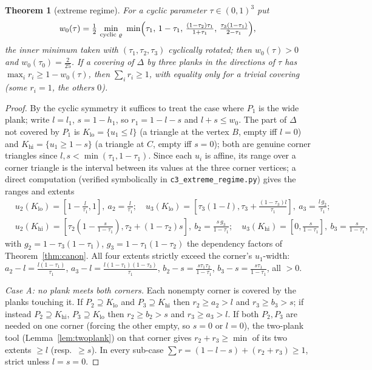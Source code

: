 \documentclass[11pt,reqno]{amsart}
\theoremstyle{plain}
\newtheorem{theorem}{Theorem}[section]
\theoremstyle{definition}
\theoremstyle{remark}
\begin{document}
\begin{theorem}[extreme regime]\label{thm:extreme}
For a cyclic parameter $\tau\in(0,1)^3$ put
\[
w_0(\tau)=\tfrac12\,\min_{\text{cyclic }\varrho}\ \min\Bigl(\tau_1,\,1-\tau_1,\,
\tfrac{(1-\tau_2)\tau_1}{1+\tau_1},\,\tfrac{\tau_3(1-\tau_1)}{2-\tau_1}\Bigr),
\]
the inner minimum taken with $(\tau_1,\tau_2,\tau_3)$ cyclically rotated; then
$w_0(\tau)>0$ and $w_0(\tau_0)=\tfrac2{25}$. If a covering of $\Delta$ by three
planks in the directions of $\tau$ has $\max_i r_i\ge1-w_0(\tau)$, then
$\sum_i r_i\ge1$, with equality only for a trivial covering (some $r_i=1$, the
others $0$).
\end{theorem}
\begin{proof}
By the cyclic symmetry it suffices to treat the case where $P_1$ is the wide
plank; write $l=l_1$, $s=1-h_1$, so $r_1=1-l-s$ and $l+s\le w_0$. The part of
$\Delta$ not covered by $P_1$ is $K_{\mathrm{lo}}=\{u_1\le l\}$ (a triangle at
the vertex $B$, empty iff $l=0$) and $K_{\mathrm{hi}}=\{u_1\ge1-s\}$ (a
triangle at $C$, empty iff $s=0$); both are genuine corner triangles since
$l,s<\min(\tau_1,1-\tau_1)$. Since each $u_i$ is affine, its range over a
corner triangle is the interval between its values at the three corner
vertices; a direct computation (verified symbolically in
\texttt{c3\_extreme\_regime.py}) gives the ranges and extents
\[
\begin{aligned}
&u_2(K_{\mathrm{lo}})=[1-\tfrac l{\tau_1},1],\ a_2=\tfrac l{\tau_1};\quad
u_3(K_{\mathrm{lo}})=[\tau_3(1-l),\tau_3+\tfrac{(1-\tau_3)l}{\tau_1}],\
a_3=\tfrac{l\,g_2}{\tau_1};\\
&u_2(K_{\mathrm{hi}})=[\tau_2(1-\tfrac s{1-\tau_1}),\tau_2+(1-\tau_2)s],\
b_2=\tfrac{s\,g_3}{1-\tau_1};\quad
u_3(K_{\mathrm{hi}})=[0,\tfrac s{1-\tau_1}],\ b_3=\tfrac s{1-\tau_1},
\end{aligned}
\]
with $g_2=1-\tau_3(1-\tau_1)$, $g_3=1-\tau_1(1-\tau_2)$ the dependency factors
of Theorem~\ref{thm:canon}. All four extents strictly exceed the corner's
$u_1$-width: $a_2-l=\tfrac{l(1-\tau_1)}{\tau_1}$, $a_3-l=\tfrac{l(1-\tau_1)
(1-\tau_3)}{\tau_1}$, $b_2-s=\tfrac{s\tau_1\tau_2}{1-\tau_1}$,
$b_3-s=\tfrac{s\tau_1}{1-\tau_1}$, all $>0$.

\emph{Case A: no plank meets both corners.} Each nonempty corner is covered by
the planks touching it. If $P_2\supseteq K_{\mathrm{lo}}$ and
$P_3\supseteq K_{\mathrm{hi}}$ then $r_2\ge a_2>l$ and $r_3\ge b_3>s$; if
instead $P_2\supseteq K_{\mathrm{hi}}$, $P_3\supseteq K_{\mathrm{lo}}$ then
$r_2\ge b_2>s$ and $r_3\ge a_3>l$. If both $P_2,P_3$ are needed on one corner
(forcing the other empty, so $s=0$ or $l=0$), the two-plank tool
(Lemma~\ref{lem:twoplank}) on that corner gives $r_2+r_3\ge\min$ of its two
extents $\ge l$ (resp.\ $\ge s$). In every sub-case
$\sum r=(1-l-s)+(r_2+r_3)\ge1$, strict unless $l=s=0$.


\end{proof}
\end{document}

